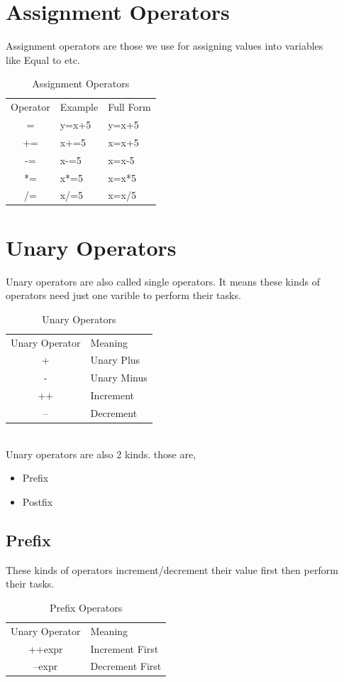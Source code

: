 \documentclass[openany]{book}  %
\begin{document}
\section{Assignment Operators}
Assignment operators\cite{Ref8} are those we use for assigning values into variables \\
like Equal to etc.
% 
% 
\begin{table}[htbp]
    \begin{tabular}{cll}
        Operator & Example & Full Form \\
        =        & y=x+5   & y=x+5     \\
        +=       & x+=5    & x=x+5     \\
        -=       & x-=5    & x=x-5     \\
        *=       & x*=5    & x=x*5     \\
        /=       & x/=5    & x=x/5
    \end{tabular}
    \centering
    \caption{Assignment Operators}
\end{table}
% 
% 
\section{Unary Operators}
Unary operators\cite{Ref8} are also called single operators. It means these kinds of \\
operators need just one varible to perform their tasks.
% 
% 
\begin{table}[htbp]
    \begin{tabular}{cl}
        Unary Operator & Meaning     \\
        +              & Unary Plus  \\
        -              & Unary Minus \\
        ++             & Increment   \\
        --             & Decrement
    \end{tabular}
    \centering
    \caption{Unary Operators}
\end{table}
\\ Unary operators are also 2 kinds. those are,
\begin{itemize}
    \item Prefix
    \item Postfix
\end{itemize}
% 
% 
\subsection{Prefix}
These kinds of operators\cite{Ref8} increment/decrement their value first then perform \\
their tasks.
% 
% 
\begin{table}[htbp]
    \begin{tabular}{cl}
        Unary Operator & Meaning         \\
        ++expr         & Increment First \\
        --expr         & Decrement First
    \end{tabular}
    \centering
    \caption{Prefix Operators}
\end{table}
% 
% 
\end{document}
